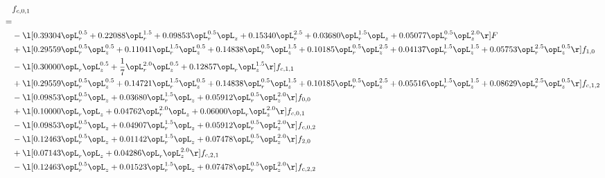 \begin{alignat}{2} 
\label{eq:f_01_1} 
& f_{c,0,1} \nonumber \\ 
 = \\ 
& - \l[  0.39304 \opL_r^{0.5} +  0.22088 \opL_r^{1.5} +  0.09853 \opL_r^{0.5} \opL_z +  0.15340 \opL_r^{2.5} +  0.03680 \opL_r^{1.5} \opL_z +  0.05077 \opL_r^{0.5} \opL_z^{2.0}  \r] F \nonumber \\ 
& + \l[  0.29559 \opL_r^{0.5} \opL_z^{0.5} +  0.11041 \opL_r^{1.5} \opL_z^{0.5} +  0.14838 \opL_r^{0.5} \opL_z^{1.5} +  0.10185 \opL_r^{0.5} \opL_z^{2.5} +  0.04137 \opL_r^{1.5} \opL_z^{1.5} +  0.05753 \opL_r^{2.5} \opL_z^{0.5}  \r] f_{1,0} \nonumber \\ 
& - \l[  0.30000 \opL_r \opL_z^{0.5} + \frac{1}{7} \opL_r^{2.0} \opL_z^{0.5} +  0.12857 \opL_r \opL_z^{1.5}  \r] f_{c,1,1} \nonumber \\ 
& + \l[  0.29559 \opL_r^{0.5} \opL_z^{0.5} +  0.14721 \opL_r^{1.5} \opL_z^{0.5} +  0.14838 \opL_r^{0.5} \opL_z^{1.5} +  0.10185 \opL_r^{0.5} \opL_z^{2.5} +  0.05516 \opL_r^{1.5} \opL_z^{1.5} +  0.08629 \opL_r^{2.5} \opL_z^{0.5}  \r] f_{c,1,2} \nonumber \\ 
& - \l[  0.09853 \opL_r^{0.5} \opL_z +  0.03680 \opL_r^{1.5} \opL_z +  0.05912 \opL_r^{0.5} \opL_z^{2.0}  \r] f_{0,0} \nonumber \\ 
& + \l[  0.10000 \opL_r \opL_z +  0.04762 \opL_r^{2.0} \opL_z +  0.06000 \opL_r \opL_z^{2.0}  \r] f_{c,0,1} \nonumber \\ 
& - \l[  0.09853 \opL_r^{0.5} \opL_z +  0.04907 \opL_r^{1.5} \opL_z +  0.05912 \opL_r^{0.5} \opL_z^{2.0}  \r] f_{c,0,2} \nonumber \\ 
& - \l[  0.12463 \opL_r^{0.5} \opL_z +  0.01142 \opL_r^{1.5} \opL_z +  0.07478 \opL_r^{0.5} \opL_z^{2.0}  \r] f_{2,0} \nonumber \\ 
& + \l[  0.07143 \opL_r \opL_z +  0.04286 \opL_r \opL_z^{2.0}  \r] f_{c,2,1} \nonumber \\ 
& - \l[  0.12463 \opL_r^{0.5} \opL_z +  0.01523 \opL_r^{1.5} \opL_z +  0.07478 \opL_r^{0.5} \opL_z^{2.0}  \r] f_{c,2,2} \nonumber \\ 
\end{alignat} 


